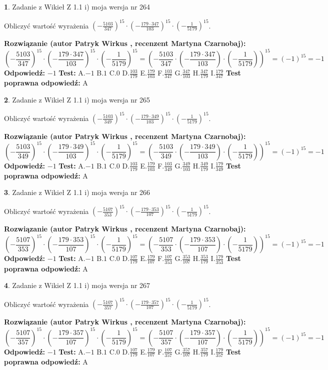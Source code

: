 \documentclass[12pt, a4paper]{article}
\theoremstyle{definition} %
\newtheorem{zad}{}
\newcommand{\zadStart}[1]{\begin{zad}#1\newline}
\newcommand{\zadStop}{\end{zad}}
\newcommand{\rozwStart}[2]{\noindent \textbf{Rozwiązanie (autor #1 , recenzent #2): }\newline}
\newcommand{\rozwStop}{\newline}
\newcommand{\odpStart}{\noindent \textbf{Odpowiedź:}\newline}
\newcommand{\odpStop}{\newline}
\newcommand{\testStart}{\noindent \textbf{Test:}\newline}
\newcommand{\testStop}{\newline}
\newcommand{\kluczStart}{\noindent \textbf{Test poprawna odpowiedź:}\newline}
\newcommand{\kluczStop}{\newline}
\begin{document}
\zadStart{Zadanie z Wikieł Z 1.1 i) moja wersja nr 264}

Obliczyć wartość wyrażenia $(-\frac{5103}{347})^{15} \cdot (-\frac{179 \cdot 347}{103})^{15} \cdot (-\frac{1}{5179})^{15}$.
\zadStop
\rozwStart{Patryk Wirkus}{Martyna Czarnobaj}
$$(-\frac{5103}{347})^{15} \cdot (-\frac{179 \cdot 347}{103})^{15} \cdot (-\frac{1}{5179})^{15} = (-\frac{5103}{347} \cdot (-\frac{179 \cdot 347}{103}) \cdot (-\frac{1}{5179}))^{15} = (-1)^{15} = -1$$
\rozwStop
\odpStart
$-1$
\odpStop
\testStart
A.$-1$ B.$1$ C.$0$ D.$\frac{103}{179}$ E.$\frac{179}{103}$
F.$\frac{103}{347}$ G.$\frac{347}{103}$
H.$\frac{347}{179}$
I.$\frac{179}{347}$
\testStop
\kluczStart
A
\kluczStop



\zadStart{Zadanie z Wikieł Z 1.1 i) moja wersja nr 265}

Obliczyć wartość wyrażenia $(-\frac{5103}{349})^{15} \cdot (-\frac{179 \cdot 349}{103})^{15} \cdot (-\frac{1}{5179})^{15}$.
\zadStop
\rozwStart{Patryk Wirkus}{Martyna Czarnobaj}
$$(-\frac{5103}{349})^{15} \cdot (-\frac{179 \cdot 349}{103})^{15} \cdot (-\frac{1}{5179})^{15} = (-\frac{5103}{349} \cdot (-\frac{179 \cdot 349}{103}) \cdot (-\frac{1}{5179}))^{15} = (-1)^{15} = -1$$
\rozwStop
\odpStart
$-1$
\odpStop
\testStart
A.$-1$ B.$1$ C.$0$ D.$\frac{103}{179}$ E.$\frac{179}{103}$
F.$\frac{103}{349}$ G.$\frac{349}{103}$
H.$\frac{349}{179}$
I.$\frac{179}{349}$
\testStop
\kluczStart
A
\kluczStop



\zadStart{Zadanie z Wikieł Z 1.1 i) moja wersja nr 266}

Obliczyć wartość wyrażenia $(-\frac{5107}{353})^{15} \cdot (-\frac{179 \cdot 353}{107})^{15} \cdot (-\frac{1}{5179})^{15}$.
\zadStop
\rozwStart{Patryk Wirkus}{Martyna Czarnobaj}
$$(-\frac{5107}{353})^{15} \cdot (-\frac{179 \cdot 353}{107})^{15} \cdot (-\frac{1}{5179})^{15} = (-\frac{5107}{353} \cdot (-\frac{179 \cdot 353}{107}) \cdot (-\frac{1}{5179}))^{15} = (-1)^{15} = -1$$
\rozwStop
\odpStart
$-1$
\odpStop
\testStart
A.$-1$ B.$1$ C.$0$ D.$\frac{107}{179}$ E.$\frac{179}{107}$
F.$\frac{107}{353}$ G.$\frac{353}{107}$
H.$\frac{353}{179}$
I.$\frac{179}{353}$
\testStop
\kluczStart
A
\kluczStop



\zadStart{Zadanie z Wikieł Z 1.1 i) moja wersja nr 267}

Obliczyć wartość wyrażenia $(-\frac{5107}{357})^{15} \cdot (-\frac{179 \cdot 357}{107})^{15} \cdot (-\frac{1}{5179})^{15}$.
\zadStop
\rozwStart{Patryk Wirkus}{Martyna Czarnobaj}
$$(-\frac{5107}{357})^{15} \cdot (-\frac{179 \cdot 357}{107})^{15} \cdot (-\frac{1}{5179})^{15} = (-\frac{5107}{357} \cdot (-\frac{179 \cdot 357}{107}) \cdot (-\frac{1}{5179}))^{15} = (-1)^{15} = -1$$
\rozwStop
\odpStart
$-1$
\odpStop
\testStart
A.$-1$ B.$1$ C.$0$ D.$\frac{107}{179}$ E.$\frac{179}{107}$
F.$\frac{107}{357}$ G.$\frac{357}{107}$
H.$\frac{357}{179}$
I.$\frac{179}{357}$
\testStop
\kluczStart
A
\kluczStop
\end{document}
